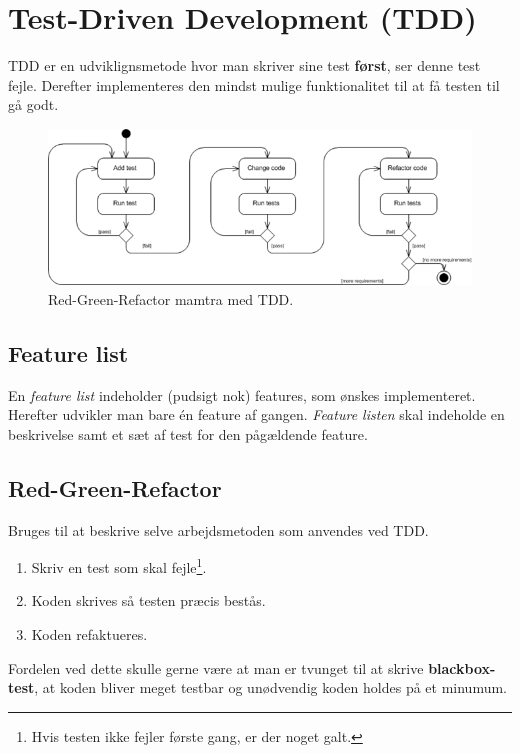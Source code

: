 \section{Test-Driven Development (TDD)}

TDD er en udviklignsmetode hvor man skriver sine test \textbf{først}, ser denne test fejle. Derefter implementeres den mindst mulige funktionalitet til at få testen til gå godt.

\begin{figure}[h]
\centering
\includegraphics[width=\linewidth]{figs/tdd}
\caption{Red-Green-Refactor mamtra med TDD.}
\label{fig:tdd}
\end{figure}

\subsection{Feature list}
En \textit{feature list} indeholder (pudsigt nok) features, som ønskes implementeret. Herefter udvikler man bare én feature af gangen. \textit{Feature listen} skal indeholde en beskrivelse samt et sæt af test for den pågældende feature.

\subsection{Red-Green-Refactor}
Bruges til at beskrive selve arbejdsmetoden som anvendes ved TDD.

\begin{enumerate}
	\item Skriv en test som skal fejle\footnote{Hvis testen ikke fejler første gang, er der noget galt.}.
	\item Koden skrives så testen præcis bestås.
	\item Koden refaktueres.
\end{enumerate}

Fordelen ved dette skulle gerne være at man er tvunget til at skrive \textbf{blackbox-test}, at koden bliver meget testbar og unødvendig koden holdes på et minumum.

